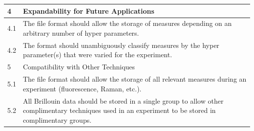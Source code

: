 \documentclass{book}
\begin{document}
\begin{tabular}{|p{1cm}|p{14cm}|}
    \cellcolor{gray!50}4 & \cellcolor{gray!50} Expandability for Future Applications \\ \hline
    4.1 &  The file format should allow the storage of measures depending on an arbitrary number of hyper parameters. \\
    4.2 &  The format should unambiguously classify measures by the hyper parameter(s) that were varied for the experiment. \\ \hline

    \cellcolor{gray!50}5 & \cellcolor{gray!50} Compatibility with Other Techniques \\ \hline
    5.1 &  The file format should allow the storage of all relevant measures during an experiment (fluorescence, Raman, etc.). \\ 
    5.2 &  All Brillouin data should be stored in a single group to allow other complimentary techniques used in an experiment to be stored in complimentary groups. \\ \hline
\end{tabular}
\end{document}
